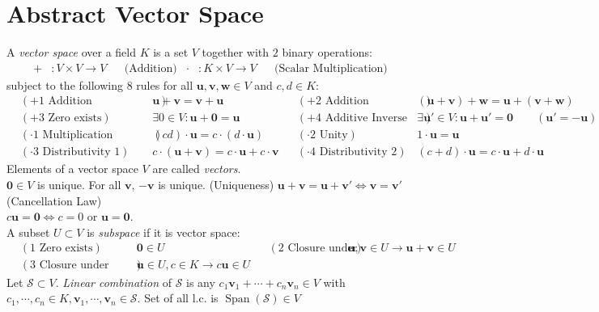 \documentclass{article}
\theoremstyle{definition}
\DeclareMathOperator{\Span}{Span}
\begin{document}
\section{Abstract Vector Space}
A \textit{vector space} over a field $K$ is a set $V$ together with $2$ binary operations:
\begin{align*}
    +&:{V\times V}\rightarrow{V} & &\text{(Addition)} & \cdot&:{K\times V}\rightarrow{V} & &\text{(Scalar Multiplication)}
    \end{align*}
subject to the following $8$ rules for all $\mathbf{u},\mathbf{v},\mathbf{w}\in V$ and $c,d\in K$:
\begin{align*}
    &(+1\text{ Addition Commutativity}) & &\mathbf{u}+\mathbf{v}=\mathbf{v}+\mathbf{u} & &(+2\text{ Addition Associativity}) & &(\mathbf{u}+\mathbf{v})+\mathbf{w}=\mathbf{u}+(\mathbf{v}+\mathbf{w})\\
    &(+3\text{ Zero exists}) & &\exists{0\in V}:\mathbf{u}+\mathbf{0}=\mathbf{u} & &(+4\text{ Additive Inverse exists}) & &\exists{\mathbf{u}'\in V}:\mathbf{u}+\mathbf{u}'=\mathbf{0}\qquad(\mathbf{u}'=-\mathbf{u})\\
    &(\cdot 1\text{ Multiplication Associativity}) & &(cd)\cdot\mathbf{u}=c\cdot(d\cdot\mathbf{u}) & &(\cdot 2\text{ Unity}) & & 1\cdot\mathbf{u}=\mathbf{u}\\
    &(\cdot 3\text{ Distributivity 1}) & & c\cdot(\mathbf{u}+\mathbf{v})=c\cdot\mathbf{u}+c\cdot\mathbf{v} & &(\cdot 4\text{ Distributivity 2}) & & (c+d)\cdot\mathbf{u}=c\cdot\mathbf{u}+d\cdot\mathbf{u}
\end{align*}
Elements of a vector space $V$ are called \textit{vectors}.\\
$\mathbf{0}\in V$ is unique. For all $\mathbf{v}$, $-\mathbf{v}$ is unique. (Uniqueness) \qquad\qquad $\mathbf{u}+\mathbf{v}=\mathbf{u}+\mathbf{v}'\Leftrightarrow\mathbf{v}=\mathbf{v}'$ (Cancellation Law)\\
$c\mathbf{u}=\mathbf{0}\Leftrightarrow{c=0}$ or $\mathbf{u}=\mathbf{0}$.\\
A subset $U\subset V$ is \textit{subspace} if it is vector space:
\begin{align*}
    &(1\text{ Zero exists}) & &\mathbf{0}\in U & &(2\text{ Closure under addition}) & \mathbf{u},\mathbf{v}\in U\rightarrow\mathbf{u}+\mathbf{v}\in U\\
    &(3\text{ Closure under multiplication}) & &\mathbf{u}\in U,c\in K\rightarrow c\mathbf{u}\in U
\end{align*}
Let $\mathcal{S}\subset V$. \textit{Linear combination} of $\mathcal{S}$ is any $c_{1}\mathbf{v}_{1}+\cdots+c_{n}\mathbf{v}_{n}\in V$ with $c_{1},\cdots,c_{n}\in K,\mathbf{v}_{1},\cdots,\mathbf{v}_{n}\in\mathcal{S}$. Set of all l.c. is $\Span(\mathcal{S})\in V$\\
\end{document}

